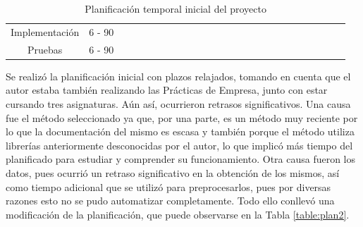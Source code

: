 \begin{table}[h]
{\begin{tabular}{|c|c|ll|llll|llll|lllll|llll|llll|}
Implementación & 6 - 90 &  &  &  &  &  &  &  &  & \cellcolor[HTML]{9B9B9B} & \cellcolor[HTML]{9B9B9B} & \cellcolor[HTML]{9B9B9B} & \cellcolor[HTML]{9B9B9B} & \cellcolor[HTML]{9B9B9B} & \cellcolor[HTML]{9B9B9B} &  &  &  &  &  &  &  &  &  \\ \cline{1-1}
Pruebas & 6 - 90 &  &  &  &  &  &  &  &  &  &  &  &  &  &  & \cellcolor[HTML]{9B9B9B} & \cellcolor[HTML]{9B9B9B} & \cellcolor[HTML]{9B9B9B} & \cellcolor[HTML]{9B9B9B} & \cellcolor[HTML]{9B9B9B} & \cellcolor[HTML]{9B9B9B} &  &  &  \\ \hline
\end{tabular}%
}
\caption{Planificación temporal inicial del proyecto}
\label{table:plan1}
\end{table}

Se realizó la planificación inicial con plazos relajados, tomando en cuenta que el autor estaba también realizando las Prácticas de Empresa, junto con estar cursando tres asignaturas. Aún así, ocurrieron retrasos significativos. Una causa fue el método seleccionado ya que, por una parte, es un método muy reciente por lo que la documentación del mismo es escasa y también porque el método utiliza librerías anteriormente desconocidas por el autor, lo que implicó más tiempo del planificado para estudiar y comprender su funcionamiento. Otra causa fueron los datos, pues ocurrió un retraso significativo en la obtención de los mismos, así como tiempo adicional que se utilizó para preprocesarlos, pues por diversas razones esto no se pudo automatizar completamente. Todo ello conllevó una modificación de la planificación, que puede observarse en la Tabla \ref{table:plan2}.


